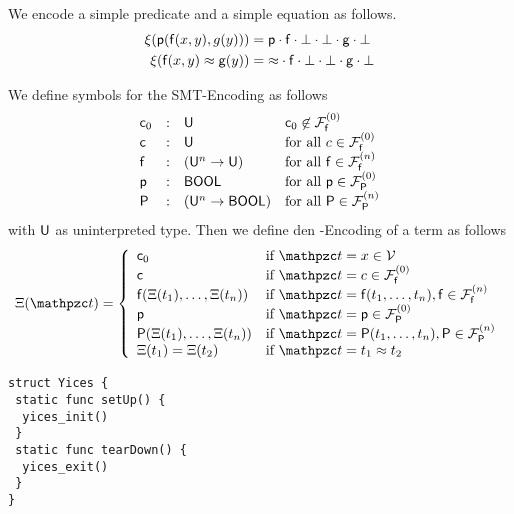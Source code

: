 \begin{example}
	We encode a simple predicate and a simple equation as follows.
	\begin{align*}
	\xi(\mpp(\mf(x,y),g(y))) &= \mpp\encsep\mf\encsep\bot\encsep\bot\encsep\mg\encsep\bot
	\\
	\xi(\mf(x,y)\mEQ \mg(y)) &= {\mEQ}\encsep\mf\encsep\bot\encsep\bot\encsep\mg\encsep\bot
	\\
	\end{align*}
\end{example}

\begin{definition}
	We define symbols for the SMT-Encoding as follows
\begin{gather*}
\begin{array}{lcll}
	\mc_0&:&\UTYPE &\mc_0\not\in\mcFfn[0]
	\\
	\mc&:&\UTYPE &\text{for all } c\in\mcFfn[0]
	\\
	\mf&:&(\UTYPE^n\rightarrow \UTYPE)
	&\text{for all }\mf\in\mcFfn{}
	\\
	\mpp&:&\BTYPE &\text{for all } \mpp\in\mcFPn[0]
	\\
	\mP&:& (\UTYPE^n \rightarrow\BTYPE)
	&\text{for all }\mP\in\mcFPn{}
\end{array}
\end{gather*}
with \( \UTYPE \) as uninterpreted type.
Then we define den \SMT-Encoding of a term as follows
\begin{gather*}
\MDEFINE{\Xi(\mct)}{lll}{
	\mc_0
	&\text{if } \mct=x\in\mcV
	\\
	\mc
	&\text{if } \mct=c\in\mcFfn[0]
	\\
	\mf(\Xi(t_1),\ldots,\Xi(t_n))
	&\text{if }\mct=\mf(t_1,\ldots,t_n), \mf\in\mcFfn{}
	\\
	\mpp
	&\text{if } \mct=\mpp\in\mcFPn[0]
	\\
	\mP(\Xi(t_1),\ldots,\Xi(t_n))
	&\text{if }\mct=\mP(t_1,\ldots,t_n), \mP\in\mcFPn{}
	\\
	\Xi(t_1) = \Xi(t_2)
	&\text{if }\mct = t_1 \mEQ t_2
}
\end{gather*}
\end{definition}

\begin{lstlisting}[language=FLEA]
struct Yices {
 static func setUp() {
  yices_init()
 }
 static func tearDown() {
  yices_exit()
 }
}
\end{lstlisting}

